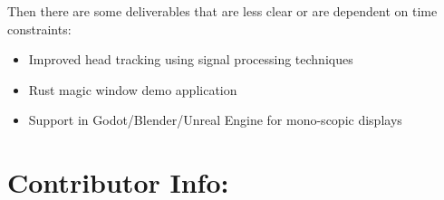\documentclass{article}
\begin{document}
\begin{normalsize}
\noindent
Then there are some deliverables that are less clear or are dependent on time
constraints:

\begin{itemize}
\item Improved head tracking using signal processing techniques
\item Rust magic window demo application
\item Support in Godot/Blender/Unreal Engine for mono-scopic displays
\end{itemize}


\section{Contributor Info:}



\end{normalsize}
\end{document}
